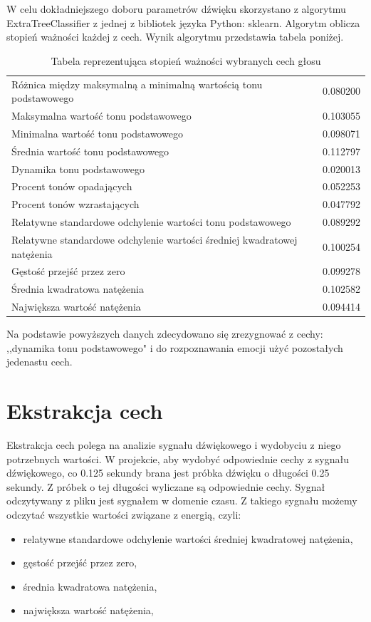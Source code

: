 \documentclass[declaration,shortabstract]{iithesis}
\begin{document}
W celu dokładniejszego doboru parametrów dźwięku skorzystano z algorytmu ExtraTreeClassifier z jednej z bibliotek języka Python: sklearn. Algorytm oblicza stopień ważności każdej z cech. Wynik algorytmu przedstawia tabela poniżej.

\begin{table}[t]
\caption{Tabela reprezentująca stopień ważności wybranych cech głosu}
\begin{tabular}{ l | r }
Różnica między maksymalną a minimalną wartością tonu podstawowego & 0.080200 \\
Maksymalna wartość tonu podstawowego & 0.103055 \\
Minimalna wartość tonu podstawowego & 0.098071 \\
Średnia wartość tonu podstawowego & 0.112797 \\
Dynamika tonu podstawowego & 0.020013 \\
Procent tonów opadających & 0.052253 \\
Procent tonów wzrastających & 0.047792 \\
Relatywne standardowe odchylenie wartości tonu podstawowego & 0.089292 \\
Relatywne standardowe odchylenie wartości średniej kwadratowej natężenia & 0.100254 \\
Gęstość przejść przez zero & 0.099278 \\
Średnia kwadratowa natężenia & 0.102582 \\
Największa wartość natężenia & 0.094414 \\
\end{tabular}
\end{table}

Na podstawie powyższych danych zdecydowano się zrezygnować z cechy: ,,dynamika tonu podstawowego" i do rozpoznawania emocji użyć pozostałych jedenastu cech.

\section{Ekstrakcja cech}

Ekstrakcja cech polega na analizie sygnału dźwiękowego i wydobyciu z niego potrzebnych wartości. W projekcie, aby wydobyć odpowiednie cechy z sygnału dźwiękowego, co 0.125 sekundy brana jest próbka dźwięku o długości 0.25 sekundy. Z próbek o tej długości wyliczane są odpowiednie cechy. Sygnał odczytywany z pliku jest sygnałem w domenie czasu. Z takiego sygnału możemy odczytać wszystkie wartości związane z energią, czyli:
\begin{itemize}
\item relatywne standardowe odchylenie wartości średniej kwadratowej natężenia,
\item gęstość przejść przez zero,
\item średnia kwadratowa natężenia, 
\item największa wartość natężenia,
\end{itemize}
\end{document}
